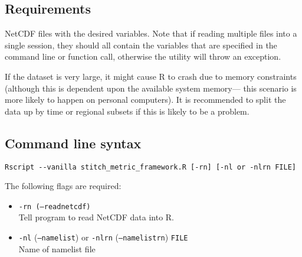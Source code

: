\documentclass{article}
\begin{document}
\subsection{Requirements}
NetCDF files with the desired variables. Note that if reading multiple files into a single session, they should all contain the variables that are specified in the command line or function call, otherwise the utility will throw an exception. 

If the dataset is very large, it might cause R to crash due to memory constraints (although this is dependent upon the available system memory--- this scenario is more likely to happen on personal computers). It is recommended to split the data up by time or regional subsets if this is likely to be a problem.

\subsection{Command line syntax}

\begin{verbatim}
Rscript --vanilla stitch_metric_framework.R [-rn] [-nl or -nlrn FILE]
\end{verbatim}

The following flags are required:

\begin{itemize}
\item[] \texttt{-rn (--readnetcdf)}\\Tell program to read NetCDF data into R.
\item[]\texttt{-nl} (\texttt{--namelist}) or \texttt{-nlrn} (\texttt{--namelistrn}) \texttt{FILE}\\ Name of namelist file
\end{itemize}
\end{document}
